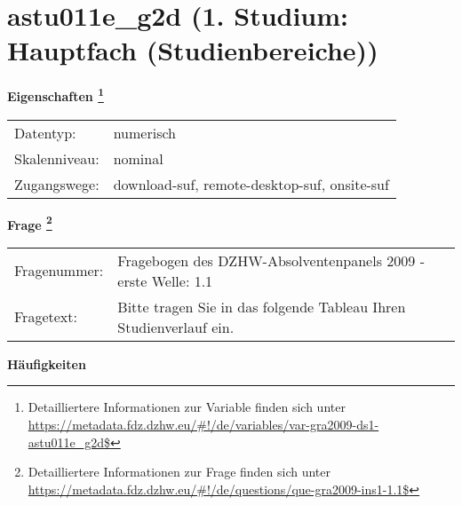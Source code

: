 
    \setcounter{footnote}{0}

    \vspace*{-1.8cm}
	\section{astu011e\_g2d (1. Studium: Hauptfach (Studienbereiche))}
	\label{section:astu011e_g2d}



    \vspace*{0.5cm}
    \noindent\textbf{Eigenschaften
	\footnote{Detailliertere Informationen zur Variable finden sich unter
		\url{https://metadata.fdz.dzhw.eu/\#!/de/variables/var-gra2009-ds1-astu011e_g2d$}}}\\
	\begin{tabularx}{\hsize}{@{}lX}
	Datentyp: & numerisch \\
	Skalenniveau: & nominal \\
	Zugangswege: &
	  download-suf, 
	  remote-desktop-suf, 
	  onsite-suf
 \\
    \end{tabularx}



				\vspace*{0.5cm}
                \noindent\textbf{Frage
	                \footnote{Detailliertere Informationen zur Frage finden sich unter
		              \url{https://metadata.fdz.dzhw.eu/\#!/de/questions/que-gra2009-ins1-1.1$}}}\\
				\begin{tabularx}{\hsize}{@{}lX}
					Fragenummer: &
					  Fragebogen des DZHW-Absolventenpanels 2009 - erste Welle:
					  1.1
 \\
					Fragetext: & Bitte tragen Sie in das folgende Tableau Ihren Studienverlauf ein. \\
				\end{tabularx}





        		\vspace*{0.5cm}
                \noindent\textbf{Häufigkeiten}

